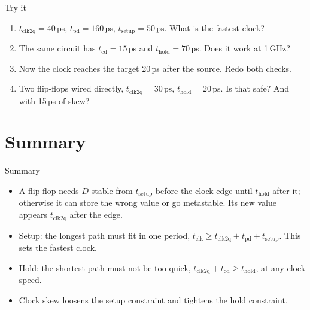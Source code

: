 \documentclass[10pt]{wosm-slides}
\begin{document}
\begin{frame}{Try it}
  \begin{enumerate}
    \item $t_{\mathrm{clk2q}} = 40$\,ps, $t_{\mathrm{pd}} = 160$\,ps,
      $t_{\mathrm{setup}} = 50$\,ps. What is the fastest clock?\par
    \item The same circuit has $t_{\mathrm{cd}} = 15$\,ps and
      $t_{\mathrm{hold}} = 70$\,ps. Does it work at 1\,GHz?\par
    \item Now the clock reaches the target 20\,ps after the source. Redo both
      checks.\par
    \item Two flip-flops wired directly, $t_{\mathrm{clk2q}} = 30$\,ps,
      $t_{\mathrm{hold}} = 20$\,ps. Is that safe? And with 15\,ps of skew?\par
  \end{enumerate}
\end{frame}

\section{Summary}

\begin{frame}{Summary}
  \begin{itemize}
    \item A flip-flop needs $D$ stable from $t_{\mathrm{setup}}$ before the clock
      edge until $t_{\mathrm{hold}}$ after it; otherwise it can store the wrong value
      or go metastable. Its new value appears $t_{\mathrm{clk2q}}$ after the edge.
    \item Setup: the longest path must fit in one period,
      $t_{\mathrm{clk}} \ge t_{\mathrm{clk2q}} + t_{\mathrm{pd}} + t_{\mathrm{setup}}$.
      This sets the fastest clock.
    \item Hold: the shortest path must not be too quick,
      $t_{\mathrm{clk2q}} + t_{\mathrm{cd}} \ge t_{\mathrm{hold}}$, at any clock
      speed.
    \item Clock skew loosens the setup constraint and tightens the hold constraint.
  \end{itemize}
\end{frame}
\end{document}
